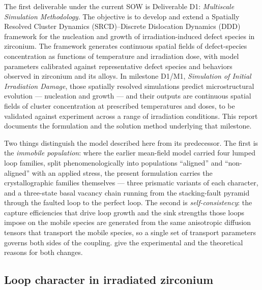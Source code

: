 \documentclass{article}
\begin{document}
The first deliverable under the current SOW is Deliverable D1: \emph{Multiscale
Simulation Methodology}. The objective is to develop and extend a
Spatially Resolved Cluster Dynamics (SRCD)--Discrete Dislocation Dynamics (DDD)
framework for the nucleation and growth of irradiation-induced defect species in
zirconium. The framework generates continuous spatial fields of defect-species
concentration as functions of temperature and irradiation dose, with model
parameters calibrated against representative defect species and behaviors
observed in zirconium and its alloys. In milestone D1/M1, \emph{Simulation of
Initial Irradiation Damage}, those spatially resolved simulations predict
microstructural evolution --- nucleation and growth --- and their outputs are
continuous spatial fields of cluster concentration at prescribed temperatures
and doses, to be validated against experiment across a range of irradiation
conditions. This report documents the formulation and the solution method
underlying that milestone.

Two things distinguish the model described here from its predecessor. The first
is the \emph{immobile population}: where the earlier mean-field model carried
four lumped loop families, split phenomenologically into populations
``aligned'' and ``non-aligned'' with an applied stress, the present formulation
carries the crystallographic families themselves --- three prismatic variants of
each character, and a three-state basal vacancy chain running from the
stacking-fault pyramid through the faulted loop to the perfect loop. The second is
\emph{self-consistency}: the capture efficiencies that drive loop growth and the
sink strengths those loops impose on the mobile species are generated from the
same anisotropic diffusion tensors that transport the mobile species, so a
single set of transport parameters governs both sides of the coupling.
 give the experimental and the theoretical
reasons for both changes.

\subsection{Loop character in irradiated zirconium}
\label{sec:loopchar}
\end{document}
